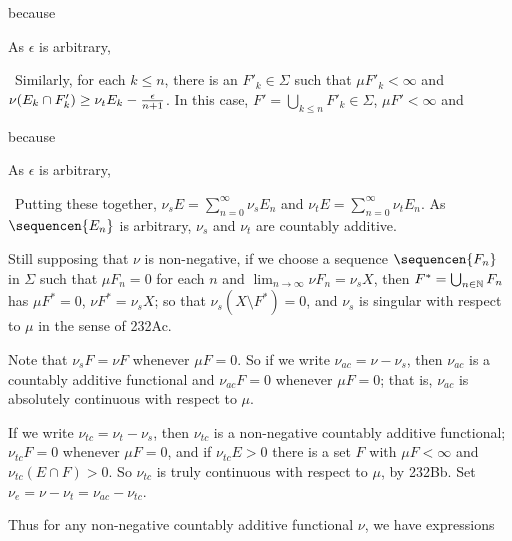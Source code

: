 {{\noindent because


\noindent   As $\epsilon$ is arbitrary,


\noindent
\grheadd\ Similarly, for each $k\le n$, there is an $F'_k\in\Sigma$
such that
$\mu F'_k<\infty$ and
$\nu(E_k\cap F'_k)\ge\nu_tE_k-{{\epsilon}\over{n+1}}$.   In this case,
$F'=\bigcup_{k\le n}F'_k\in\Sigma$, $\mu F'<\infty$ and


\noindent because


\noindent   As $\epsilon$ is arbitrary,


\noindent \grheade\ Putting these together,
$\nu_sE=\sum_{n=0}^{\infty}\nu_sE_n$ and
$\nu_tE=\sum_{n=0}^{\infty}\nu_tE_n$.   As $\sequencen{E_n}$ is
arbitrary, $\nu_s$ and $\nu_t$ are countably additive.\ \Qed}


\medskip

  Still supposing that $\nu$ is
non-negative, if we choose a sequence $\sequencen{F_n}$ in
$\Sigma$ such
that $\mu F_n=0$ for each $n$ and $\lim_{n\to\infty}\nu F_n=\nu_sX$,
then $F^*=\bigcup_{n\in\Bbb N}F_n$ has $\mu F^*=0$, $\nu F^*=\nu_sX$;
so that $\nu_s(X\setminus F^*)=0$, and $\nu_s$ is singular with respect
to $\mu$ in the sense of 232Ac.

Note that $\nu_sF=\nu F$ whenever $\mu F=0$.   So if we write
$\nu_{ac}=\nu-\nu_s$, then $\nu_{ac}$ is a countably additive functional
and $\nu_{ac}F=0$ whenever $\mu F=0$;  that is, $\nu_{ac}$ is absolutely
continuous with respect to $\mu$.

If we write $\nu_{tc}=\nu_t-\nu_s$, then $\nu_{tc}$ is a non-negative
countably additive functional;  $\nu_{tc}F=0$ whenever $\mu F=0$, and if
$\nu_{tc}E>0$ there is a set $F$ with $\mu F<\infty$ and
$\nu_{tc}(E\cap F)>0$.   So $\nu_{tc}$ is truly continuous with respect
to $\mu$, by 232Bb.   Set $\nu_e=\nu-\nu_t=\nu_{ac}-\nu_{tc}$.

Thus for any non-negative countably additive functional $\nu$, we have
expressions

}
